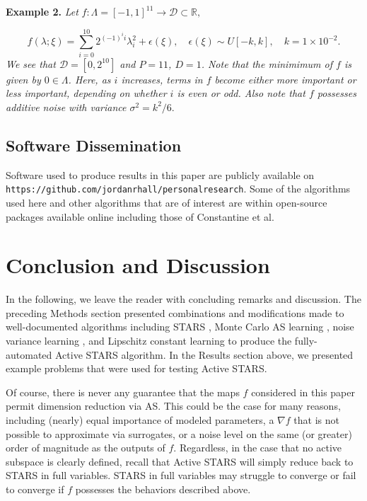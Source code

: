 \documentclass{amsart}
\newcommand{\D}{\mathcal{D}}
\newcommand{\R}{\mathbb{R}}
\begin{document}
\noindent \textbf{Example 2.} \textit{Let} $f: \Lambda=[-1,1]^{11} \to \D \subset \R,$  

$$f(\lambda; \xi)=\sum_{i=0}^{10} 2^{(-1)^i i}\lambda_i^2+\epsilon(\xi), \quad \epsilon(\xi) \sim U[-k,k], \quad k=1 \times 10^{-2}.$$ \textit{We see that $\mathcal{D}=[0,2^{10}]$ and $P=11$, $D=1$. Note that the minimimum of $f$ is given by $0 \in \Lambda$. Here, as $i$ increases, terms in $f$ become either more important or less important, depending on whether $i$ is even or odd. Also note that $f$ possesses additive noise with variance $\sigma^2=k^2/6.$}












\subsection{Software Dissemination}

Software used to produce results in this paper are publicly available on \texttt{https://github.com/jordanrhall/personalresearch}. Some of the algorithms used here and other algorithms that are of interest are within open-source packages available online including those of Constantine et al.


\section{Conclusion and Discussion}

In the following, we leave the reader with concluding remarks and discussion. The preceding Methods section presented combinations and modifications made to well-documented algorithms including STARS \cite{CW}, Monte Carlo AS learning \cite{ConstantineMC}, noise variance learning \cite{MW}, and Lipschitz constant learning \cite{Calliess} to produce the fully-automated Active STARS algorithm. In the Results section above, we presented example problems that were used for testing Active STARS.

Of course, there is never any guarantee that the maps $f$ considered in this paper permit dimension reduction via AS. This could be the case for many reasons, including (nearly) equal importance of modeled parameters, a $\nabla f$ that is not possible to approximate via surrogates, or a noise level on the same (or greater) order of magnitude as the outputs of $f$. Regardless, in the case that no active subspace is clearly defined, recall that Active STARS will simply reduce back to STARS in full variables. STARS in full variables may struggle to converge or fail to converge if $f$ possesses the behaviors described above.
\end{document}
